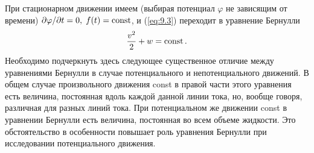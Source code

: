При стационарном движении имеем (выбирая потенциал $\varphi$ не зависящим от
времени) $\partial\varphi/\partial t=0,\; f(t)=\mathop{\mathrm{const}}\nolimits$, и (\ref{eq:9.3}) переходит в
уравнение Бернулли
\begin{equation}
   \label{eq:9.4}
   \frac{v^2}{2} + w = \mathop{\mathrm{const}}\nolimits.
\end{equation}
Необходимо подчеркнуть здесь следующее существенное отличие между уравнениями
Бернулли в случае потенциального и непотенциального движений. В общем случае
произвольного движения const в правой части этого уравнения есть величина,
постоянная вдоль каждой данной линии тока, но, вообще говоря, различная для
разных линий тока. При потенциальном же движении const в уравнении Бернулли есть
величина, постоянная во всем объеме жидкости. Это обстоятельство в особенности
повышает роль уравнения Бернулли при исследовании потенциального движения.

